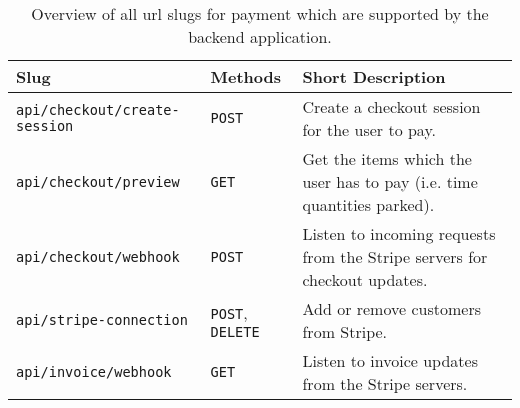 \begin{table}[ht!]
    \centering
    \begin{tabular}{|l|l|p{7cm}|}
        \hline
    \textbf{Slug} & \textbf{Methods} & \textbf{Short Description}  \\
    \hline
        \hline
        \texttt{api/checkout/create-session} &  \texttt{POST} & Create a checkout session for the user to pay.\\
        \hline
        \texttt{api/checkout/preview} &  \texttt{GET} & Get the items which the user has to pay (i.e. time quantities parked).\\
        \hline
        \texttt{api/checkout/webhook} &  \texttt{POST} & Listen to incoming requests from the Stripe servers for checkout updates.\\
        \hline
        \texttt{api/stripe-connection} &  \texttt{POST}, \texttt{DELETE} & Add or remove customers from Stripe.\\
        \hline
        \texttt{api/invoice/webhook} &  \texttt{GET} & Listen to invoice updates from the Stripe servers.\\
        \hline
    \end{tabular}
    \caption{Overview of all \ac{url} slugs for payment which are supported by the backend application.}
    \label{tab:url-payment}
\end{table}

\clearpage